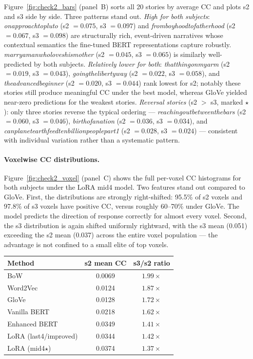 \documentclass[letterpaper,12pt]{article}
\begin{document}
Figure~\ref{fig:check2_bars} (panel~B) sorts all 20 stories by average CC
and plots s2 and s3 side by side.  Three patterns stand out.
\textit{High for both subjects}:
\textit{onapproachtopluto} (s2 $= 0.075$, s3 $= 0.097$) and
\textit{fromboyhoodtofatherhood} (s2 $= 0.067$, s3 $= 0.098$) are
structurally rich, event-driven narratives whose contextual semantics the
fine-tuned BERT representations capture robustly.
\textit{marryamanwholoveshismother} (s2 $= 0.045$, s3 $= 0.065$) is
similarly well-predicted by both subjects.
\textit{Relatively lower for both}:
\textit{thatthingonmyarm} (s2 $= 0.019$, s3 $= 0.043$),
\textit{goingthelibertyway} (s2 $= 0.022$, s3 $= 0.058$), and
\textit{theadvancedbeginner} (s2 $= 0.020$, s3 $= 0.044$) rank lowest
for s2; notably these stories still produce meaningful CC under the best
model, whereas GloVe yielded near-zero predictions for the weakest stories.
\textit{Reversal stories} (s2 $>$ s3, marked $\star$):
only three stories reverse the typical ordering ---
\textit{reachingoutbetweenthebars} (s2 $= 0.060$, s3 $= 0.046$),
\textit{birthofanation} (s2 $= 0.036$, s3 $= 0.034$), and
\textit{canplanetearthfeedtenbillionpeoplepart1}
(s2 $= 0.028$, s3 $= 0.024$) --- consistent with individual variation
rather than a systematic pattern.

\paragraph{Voxelwise CC distributions.}
Figure~\ref{fig:check2_voxel} (panel~C) shows the full per-voxel CC
histograms for both subjects under the LoRA mid4 model.
Two features stand out compared to GloVe.
First, the distributions are strongly right-shifted: 95.5\% of s2 voxels
and 97.8\% of s3 voxels have positive CC, versus roughly 60--70\% under
GloVe.  The model predicts the direction of response correctly for almost
every voxel.
Second, the s3 distribution is again shifted uniformly rightward, with
the s3 mean (0.051) exceeding the s2 mean (0.037) across the entire
voxel population --- the advantage is not confined to a small elite of
top voxels.


\begin{center}
\begin{tabular}{lcc}
  \toprule
  Method & s2 mean CC & s3/s2 ratio \\
  \midrule
  BoW                  & 0.0069 & $1.99\times$ \\
  Word2Vec             & 0.0124 & $1.87\times$ \\
  GloVe                & 0.0128 & $1.72\times$ \\
  Vanilla BERT         & 0.0218 & $1.62\times$ \\
  Enhanced BERT        & 0.0349 & $1.41\times$ \\
  LoRA (last4/improved)& 0.0344 & $1.42\times$ \\
  LoRA (mid4$\star$)   & 0.0374 & $1.37\times$ \\
  \bottomrule
\end{tabular}
\end{center}
\end{document}
